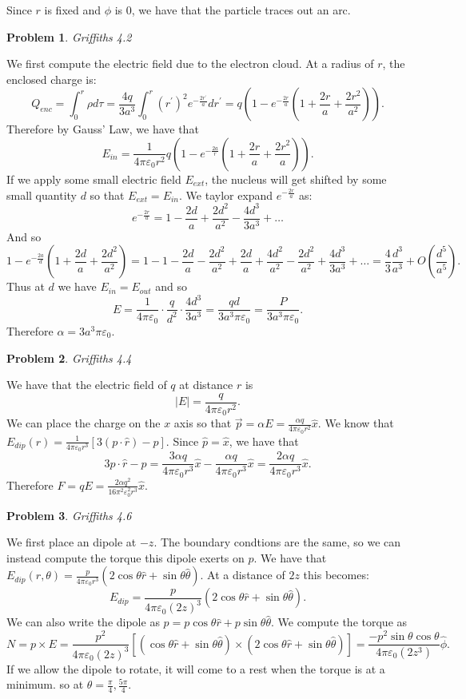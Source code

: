 \documentclass[12pt, a4paper]{article}
\newtheorem{problem}{Problem}
\theoremstyle{definition}
\newcommand{\ep}{\varepsilon}
\begin{document}
Since $r$ is fixed and $\phi$ is 0, we have that the particle traces out an arc. 
\newpage
\begin{problem}
	Griffiths 4.2
\end{problem}
We first compute the electric field due to the electron cloud. At a radius of $r$, the enclosed charge is: 
$$Q_{enc} = \int_0^r \rho d\tau = \frac{4 q}{3a^3}\int_0^r (r^\prime)^2 e^{-\frac{2r^\prime}{a}} dr^\prime = q\left(1 - e^{-\frac{2r}{a}}(1 + \frac{2r}{a} + \frac{2r^2}{a^2}) \right).$$
Therefore by Gauss' Law, we have that 
$$E_{in} =\frac{1}{4\pi \ep_0r^2} q\left( 1 - e^{-\frac{2a}{r}} (1+ \frac{2r}{a} + \frac{2r^2}{a}) \right).$$
If we apply some small electric field $E_{ext}$, the nucleus will get shifted by some small quantity $d$ so that $E_{ext} = E_{in}$. We taylor expand $e^{-\frac{2r}{a}}$ as: 
$$e^{-\frac{2r}{a}}= 1 - \frac{2d}{a} + \frac{2d^2}{a^2} - \frac{4d^3}{3a^3}+ \dots $$
And so
$$1 - e^{-\frac{2a}{d}} \left(1 + \frac{2d}{a} + \frac{2d^2}{a^2} \right) = 1 - 1 -\frac{2d}{a} -\frac{2d^2}{a^2}+\frac{2d}{a} + \frac{4d^2}{a^2} - \frac{2d^2}{a^2}  + \frac{4d^3}{3a^3}+ \dots  = \frac{4}{3} \frac{d^3}{a^3} +O \left(\frac{d^5}{a^5} \right).$$
Thus at $d$ we have $E_{in} = E_{out}$ and so 
$$E = \frac{1}{4\pi \ep_0} \cdot \frac{q}{d^2} \cdot \frac{4d^3}{3a^3} = \frac{qd}{3a^3 \pi \ep_0}= \frac{P}{3a^3 \pi \ep_0}.$$
Therefore $\alpha = 3a^3 \pi \ep_0$. 
\newpage
\begin{problem}
	Griffiths 4.4
\end{problem}
We have that the electric field of $q$ at distance $r$ is 
$$|E| = \frac{q}{4\pi \ep_0 r^2}.$$
We can place the charge on the $x$ axis so that $\vec{p} = \alpha E = \frac{\alpha q}{4\pi \ep_0 r^2}\hat{x}.$
We know that $E_{dip}(r) = \frac{1}{4\pi \ep_0 r^3} \left[3(p \cdot \hat{r} )- p \right]$. Since $\hat{p}= \hat{x}$, we have that $$3 p\cdot \hat{r} - p = \frac{3\alpha q}{4\pi \ep_0 r^3}\hat{x} - \frac{\alpha q}{4\pi \ep_0r^3}\hat{x} = \frac{2\alpha q}{4\pi \ep_0 r^3} \hat{x}.$$
Therefore $F = qE = \frac{2\alpha q^2}{16\pi^2 \ep_0^2 r^3} \hat{x}$. 
\newpage
\begin{problem}
	Griffiths 4.6
\end{problem}
We first place an dipole at $-z$. The boundary condtions are the same, so we can instead compute the torque this dipole exerts on $p$. 
We have that $E_{dip} (r, \theta)= \frac{p}{4\pi \ep_0 r^3} ( 2\cos \theta \hat{r} + \sin \theta \hat{\theta})$. 
At a distance of $2z$ this becomes: 
$$E_{dip} = \frac{p}{4\pi \ep_0 (2z)^3}(2 \cos \theta \hat{r} + \sin \theta \hat{\theta}). $$
We can also write the dipole as $p = p \cos \theta \hat{r} + p \sin \theta \hat{\theta}$. 
We compute the torque as $$N = p \times E = \frac{p^2}{4\pi \ep_0 (2z)^3}\left[(\cos \theta \hat{r} + \sin \theta \hat{\theta}) \times (2 \cos \theta \hat{r} + \sin \theta \hat{\theta}) \right] = \frac{-p^2\sin \theta \cos \theta}{4\pi \ep_0 (2z^3)}\hat{\phi}.$$
If we allow the dipole to rotate, it will come to a rest when the torque is at a minimum. so at $\theta = \frac{\pi}{4}, \frac{5\pi}{4}$. 
\end{document}
